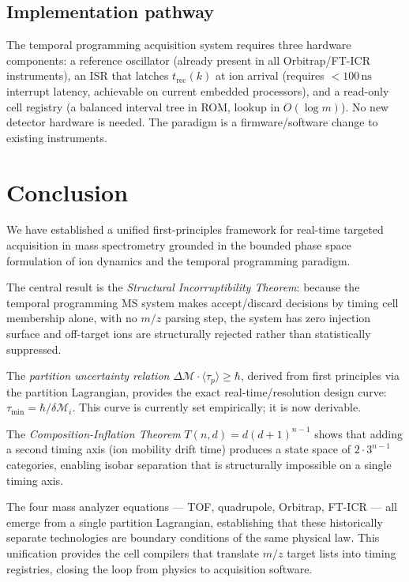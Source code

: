 \documentclass[twocolumn,10pt,a4paper]{article}
\theoremstyle{thmstyle}
\theoremstyle{definition}
\theoremstyle{remark}
\newcommand{\trec}{t_{\mathrm{rec}}}
\newcommand{\Mop}{\mathcal{M}}
\newcommand{\tp}{\langle\tau_{p}\rangle}
\begin{document}
\subsection{Implementation pathway}

The temporal programming acquisition system requires three hardware
components: a reference oscillator (already present in all
Orbitrap/FT-ICR instruments), an ISR that latches $\trec(k)$ at ion
arrival (requires $<100\,\mathrm{ns}$ interrupt latency, achievable
on current embedded processors), and a read-only cell registry (a
balanced interval tree in ROM, lookup in $O(\log m)$). No new
detector hardware is needed. The paradigm is a firmware/software
change to existing instruments.

\section{Conclusion}
\label{sec:conclusion}

We have established a unified first-principles framework for real-time
targeted acquisition in mass spectrometry grounded in the bounded phase
space formulation of ion dynamics and the temporal programming paradigm.

The central result is the \emph{Structural Incorruptibility Theorem}:
because the temporal programming MS system makes accept/discard decisions
by timing cell membership alone, with no $m/z$ parsing step, the system
has zero injection surface and off-target ions are structurally rejected
rather than statistically suppressed.

The \emph{partition uncertainty relation} $\Delta\Mop \cdot \tp \geq \hbar$,
derived from first principles via the partition Lagrangian, provides the
exact real-time/resolution design curve: $\tau_{\min} = \hbar/\delta\Mop_i$.
This curve is currently set empirically; it is now derivable.

The \emph{Composition-Inflation Theorem} $T(n,d) = d(d+1)^{n-1}$ shows
that adding a second timing axis (ion mobility drift time) produces a
state space of $2 \cdot 3^{n-1}$ categories, enabling isobar separation
that is structurally impossible on a single timing axis.

The four mass analyzer equations --- TOF, quadrupole, Orbitrap, FT-ICR ---
all emerge from a single partition Lagrangian, establishing that these
historically separate technologies are boundary conditions of the same
physical law. This unification provides the cell compilers that translate
$m/z$ target lists into timing registries, closing the loop from
physics to acquisition software.



\end{document}
